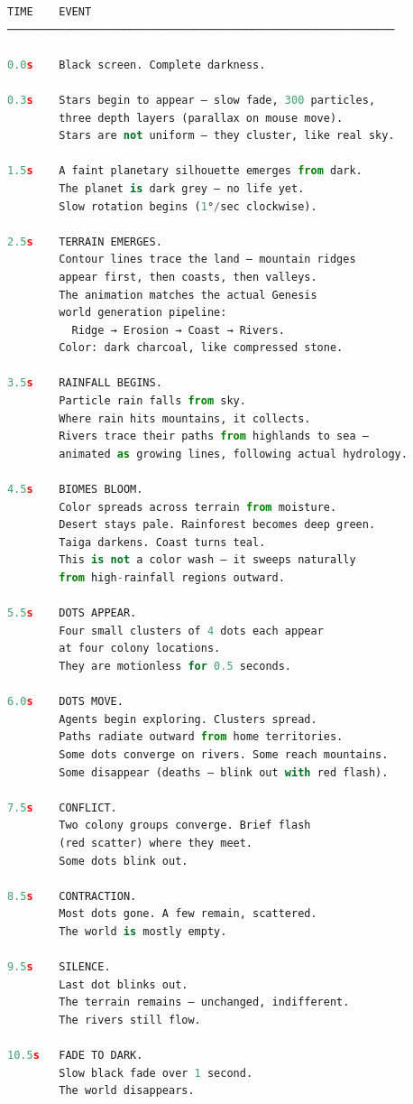 \documentclass[11pt,a4paper]{article}
\begin{document}
\begin{lstlisting}[language=Python]
TIME    EVENT
────────────────────────────────────────────────────────────

0.0s    Black screen. Complete darkness.

0.3s    Stars begin to appear — slow fade, 300 particles,
        three depth layers (parallax on mouse move).
        Stars are not uniform — they cluster, like real sky.

1.5s    A faint planetary silhouette emerges from dark.
        The planet is dark grey — no life yet.
        Slow rotation begins (1°/sec clockwise).

2.5s    TERRAIN EMERGES.
        Contour lines trace the land — mountain ridges
        appear first, then coasts, then valleys.
        The animation matches the actual Genesis
        world generation pipeline:
          Ridge → Erosion → Coast → Rivers.
        Color: dark charcoal, like compressed stone.

3.5s    RAINFALL BEGINS.
        Particle rain falls from sky.
        Where rain hits mountains, it collects.
        Rivers trace their paths from highlands to sea —
        animated as growing lines, following actual hydrology.

4.5s    BIOMES BLOOM.
        Color spreads across terrain from moisture.
        Desert stays pale. Rainforest becomes deep green.
        Taiga darkens. Coast turns teal.
        This is not a color wash — it sweeps naturally
        from high-rainfall regions outward.

5.5s    DOTS APPEAR.
        Four small clusters of 4 dots each appear
        at four colony locations.
        They are motionless for 0.5 seconds.

6.0s    DOTS MOVE.
        Agents begin exploring. Clusters spread.
        Paths radiate outward from home territories.
        Some dots converge on rivers. Some reach mountains.
        Some disappear (deaths — blink out with red flash).

7.5s    CONFLICT.
        Two colony groups converge. Brief flash
        (red scatter) where they meet.
        Some dots blink out.

8.5s    CONTRACTION.
        Most dots gone. A few remain, scattered.
        The world is mostly empty.

9.5s    SILENCE.
        Last dot blinks out.
        The terrain remains — unchanged, indifferent.
        The rivers still flow.

10.5s   FADE TO DARK.
        Slow black fade over 1 second.
        The world disappears.


\end{lstlisting}
\end{document}
